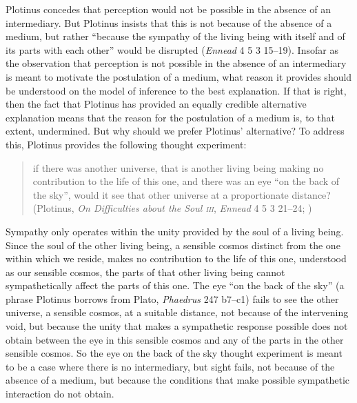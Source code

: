 
Plotinus concedes that perception would not be possible in the absence of an intermediary. But Plotinus insists that this is not because of the absence of a medium, but rather ``because the sympathy of the living being with itself and of its parts with each other'' would be disrupted (\emph{Ennead} 4 5 3 15--19). Insofar as the observation that perception is not possible in the absence of an intermediary is meant to motivate the postulation of a medium, what reason it provides should be understood on the model of inference to the best explanation. If that is right, then the fact that Plotinus has provided an equally credible alternative explanation means that the reason for the postulation of a medium is, to that extent, undermined. But why should we prefer Plotinus' alternative? To address this, Plotinus provides the following thought experiment:
\begin{quote}
	if there was another universe, that is another living being making no contribution to the life of this one, and there was an eye ``on the back of the sky'', would it see that other universe at a proportionate distance? (Plotinus, \emph{On Difficulties about the Soul \textsc{iii}}, \emph{Ennead} 4 5 3 21--24; \citealt[293]{Armstrong:1984aa})
\end{quote}
Sympathy only operates within the unity provided by the soul of a living being. Since the soul of the other living being, a sensible cosmos distinct from the one within which we reside, makes no contribution to the life of this one, understood as our sensible cosmos, the parts of that other living being cannot sympathetically affect the parts of this one. The eye ``on the back of the sky'' (a phrase Plotinus borrows from Plato, \emph{Phaedrus} 247 b7--c1) fails to see the other universe, a sensible cosmos, at a suitable distance, not because of the intervening void, but because the unity that makes a sympathetic response possible does not obtain between the eye in this sensible cosmos and any of the parts in the other sensible cosmos. So the eye on the back of the sky thought experiment is meant to be a case where there is no intermediary, but sight fails, not because of the absence of a medium, but because the conditions that make possible sympathetic interaction do not obtain.

